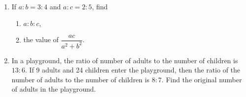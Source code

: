 \documentclass[11pt]{article}
\begin{document}
\begin{enumerate}
            \hrulefill
            
            \hrulefill
            
            \hrulefill

        \item If $a:b=3:4$ and $a:c=2:5$, find\begin{enumerate}
            \item $a:b:c$,
            \item the value of $\dfrac{ac}{a^2+b^2}$.
        \end{enumerate}

        \hrulefill

            \hrulefill
            
            \hrulefill
            
            \hrulefill
            
            \hrulefill
            
            \hrulefill
            
            \hrulefill
            
            \hrulefill
            
            \hrulefill
            
            \hrulefill
            
            \hrulefill
            
            \hrulefill

        \pagebreak
        \item In a playground, the ratio of number of adults to the number of children is $13:6$. If 9 adults and 24 children enter the playground, then the ratio of the number of adults to the number of children is $8:7$. Find the original number of adults in the playground.
        
        \hrulefill

            \hrulefill
            
            \hrulefill
            
            \hrulefill
            
            \hrulefill
            
            \hrulefill
            
            \hrulefill
            
            \hrulefill
            
            \hrulefill
            
            \hrulefill
            

\end{enumerate}
\end{document}
